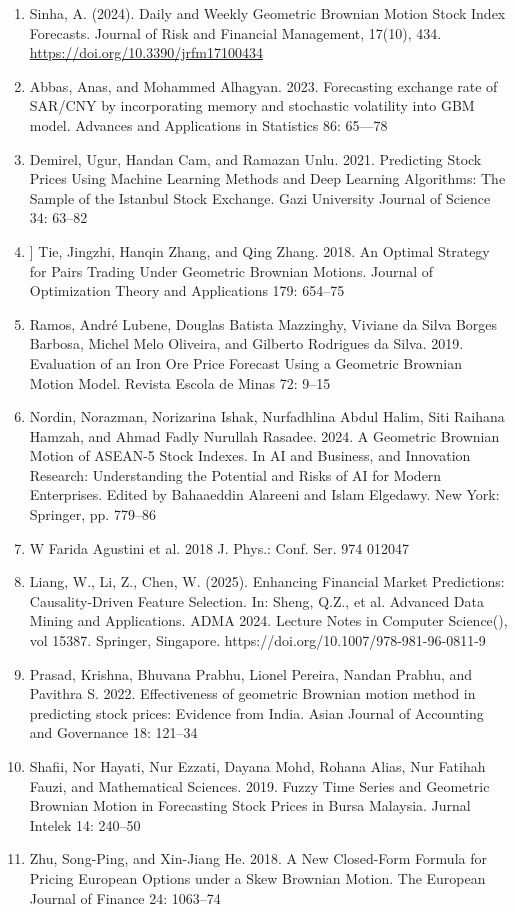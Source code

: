 \documentclass[12pt,lettersize,oneside]{book} %
\begin{document}
\begin{talk}
\begin{enumerate}
    \item[{[1]}] Sinha, A. (2024). Daily and Weekly Geometric Brownian Motion Stock Index Forecasts. Journal of Risk and Financial Management, 17(10), 434. \\ \href{https://doi.org/10.3390/jrfm17100434}{https://doi.org/10.3390/jrfm17100434}
    \item[{[2]}] Abbas, Anas, and Mohammed Alhagyan. 2023. Forecasting exchange rate of SAR/CNY by incorporating memory and stochastic volatility into GBM model. Advances and Applications in Statistics 86: 65---78
    \item[{[3]}] Demirel, Ugur, Handan Cam, and Ramazan Unlu. 2021. Predicting Stock Prices Using Machine Learning Methods and Deep Learning Algorithms: The Sample of the Istanbul Stock Exchange. Gazi University Journal of Science 34: 63--82
    \item[{[4]}]] Tie, Jingzhi, Hanqin Zhang, and Qing Zhang. 2018. An Optimal Strategy for Pairs Trading Under Geometric Brownian Motions. Journal of Optimization Theory and Applications 179: 654--75
    \item[{[5]}] Ramos, Andr\'e Lubene, Douglas Batista Mazzinghy, Viviane da Silva Borges Barbosa, Michel Melo Oliveira, and Gilberto Rodrigues da Silva. 2019. Evaluation of an Iron Ore Price Forecast Using a Geometric Brownian Motion Model. Revista Escola de Minas 72: 9--15
    \item[{[6]}] Nordin, Norazman, Norizarina Ishak, Nurfadhlina Abdul Halim, Siti Raihana Hamzah, and Ahmad Fadly Nurullah Rasadee. 2024. A Geometric Brownian Motion of ASEAN-5 Stock Indexes. In AI and Business, and Innovation Research: Understanding the Potential and Risks of AI for Modern Enterprises. Edited by Bahaaeddin Alareeni and Islam Elgedawy. New York: Springer, pp. 779--86
    \item[{[7]}] W Farida Agustini et al. 2018 J. Phys.: Conf. Ser. 974 012047
    \item[{[8]}] Liang, W., Li, Z., Chen, W. (2025). Enhancing Financial Market Predictions: Causality-Driven Feature Selection. In: Sheng, Q.Z., et al. Advanced Data Mining and Applications. ADMA 2024. Lecture Notes in Computer Science(), vol 15387. Springer, Singapore. https://doi.org/10.1007/978-981-96-0811-9
    \item[{[9]}] Prasad, Krishna, Bhuvana Prabhu, Lionel Pereira, Nandan Prabhu, and Pavithra S. 2022. Effectiveness of geometric Brownian motion method in predicting stock prices: Evidence from India. Asian Journal of Accounting and Governance 18: 121--34
    \item[{[10]}] Shafii, Nor Hayati, Nur Ezzati, Dayana Mohd, Rohana Alias, Nur Fatihah Fauzi, and Mathematical Sciences. 2019. Fuzzy Time Series and Geometric Brownian Motion in Forecasting Stock Prices in Bursa Malaysia. Jurnal Intelek 14: 240--50
    \item[{[11]}] Zhu, Song-Ping, and Xin-Jiang He. 2018. A New Closed-Form Formula for Pricing European Options under a Skew Brownian Motion. The European Journal of Finance 24: 1063--74
\end{enumerate}


\end{talk}
\end{document}
